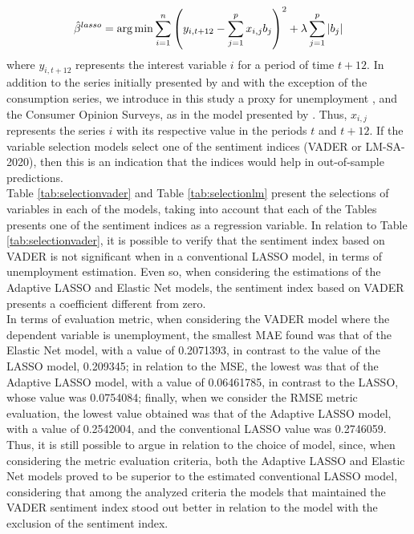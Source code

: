 \begin{align}
    \hat{\beta}^{lasso} = \operatorname*{arg\,min} \sum_{i=1}^{n}\left(y_{i,t+12} - \sum_{j=1}^{p}x_{i,j}b_j\right)^2 +\lambda\sum_{j=1}^p |b_j|
\end{align}
where $y_{i,t+12}$ represents the interest variable $i$ for a period of time $t+12$. In addition to the series initially presented by \cite{barsky2012information} and with the exception of the consumption series, we introduce in this study a proxy for unemployment \cite[]{shapiro2020measuring}, and the Consumer Opinion Surveys, as in the model presented by \cite{shapiro2020measuring}. Thus, $x_{i,j}$ represents the series $i$ with its respective value in the periods $t$ and $t+12$. If the variable selection models select one of the sentiment indices (VADER or LM-SA-2020), then this is an indication that the indices would help in out-of-sample predictions.\\

Table \ref{tab:selectionvader} and Table \ref{tab:selectionlm} present the selections of variables in each of the models, taking into account that each of the Tables presents one of the sentiment indices as a regression variable. In relation to Table \ref{tab:selectionvader}, it is possible to verify that the sentiment index based on VADER is not significant when in a conventional LASSO model, in terms of unemployment estimation. Even so, when considering the estimations of the Adaptive LASSO and Elastic Net models, the sentiment index based on VADER presents a coefficient different from zero. \\

In terms of evaluation metric, when considering the VADER model where the dependent variable is unemployment, the smallest MAE found was that of the Elastic Net model, with a value of 0.2071393, in contrast to the value of the LASSO model, 0.209345; in relation to the MSE, the lowest was that of the Adaptive LASSO model, with a value of 0.06461785, in contrast to the LASSO, whose value was 0.0754084; finally, when we consider the RMSE metric evaluation, the lowest value obtained was that of the Adaptive LASSO model, with a value of 0.2542004, and the conventional LASSO value was 0.2746059. Thus, it is still possible to argue in relation to the choice of model, since, when considering the metric evaluation criteria, both the Adaptive LASSO and Elastic Net models proved to be superior to the estimated conventional LASSO model, considering that among the analyzed criteria the models that maintained the VADER sentiment index stood out better in relation to the model with the exclusion of the sentiment index.\\

